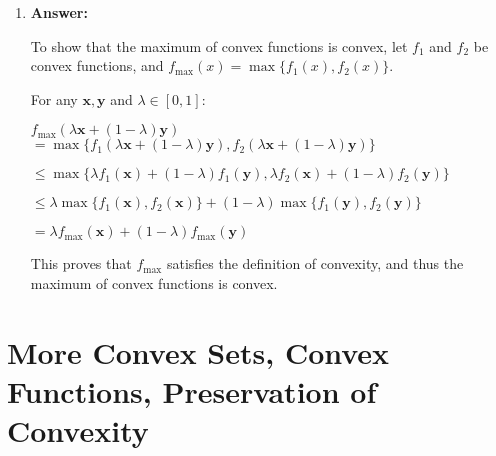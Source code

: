 \documentclass{article}
\newenvironment{answer}
    {\par\noindent\textbf{Answer:}\par}
    {\par}
\begin{document}
\begin{enumerate}
\begin{enumerate}
\begin{answer}
        \begin{center}
        \end{center}
        
        As shown in the figure, the red line segment connecting points in the two circles is not entirely contained within the union of the circles, demonstrating that the union is not convex.
        \end{answer}

        \item 
        \begin{answer}
        To show that the maximum of convex functions is convex, let $f_1$ and $f_2$ be convex functions, and $f_{\max}(x) = \max\{f_1(x), f_2(x)\}$.
        
        For any $\mathbf{x}, \mathbf{y}$ and $\lambda \in [0,1]$:
        
        $f_{\max}(\lambda\mathbf{x} + (1-\lambda)\mathbf{y})$
        $= \max\{f_1(\lambda\mathbf{x} + (1-\lambda)\mathbf{y}), f_2(\lambda\mathbf{x} + (1-\lambda)\mathbf{y})\}$
        
        $\leq \max\{\lambda f_1(\mathbf{x}) + (1-\lambda)f_1(\mathbf{y}), \lambda f_2(\mathbf{x}) + (1-\lambda)f_2(\mathbf{y})\}$
        
        $\leq \lambda \max\{f_1(\mathbf{x}), f_2(\mathbf{x})\} + (1-\lambda) \max\{f_1(\mathbf{y}), f_2(\mathbf{y})\}$
        
        $= \lambda f_{\max}(\mathbf{x}) + (1-\lambda) f_{\max}(\mathbf{y})$
        
        This proves that $f_{\max}$ satisfies the definition of convexity, and thus the maximum of convex functions is convex.
        \end{answer}
    \end{enumerate}

    \section{More Convex Sets, Convex Functions, Preservation of Convexity}


\end{enumerate}
\end{document}
